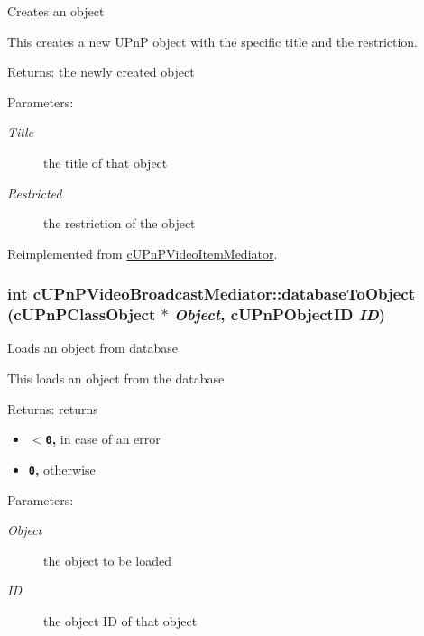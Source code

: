 Creates an object

This creates a new UPnP object with the specific title and the restriction.

\begin{Desc}
\item[Returns:]the newly created object \end{Desc}
\begin{Desc}
\item[Parameters:]
\begin{description}
\item[{\em Title}]the title of that object \item[{\em Restricted}]the restriction of the object \end{description}
\end{Desc}
  

Reimplemented from \hyperlink{classcUPnPVideoItemMediator_27e001142c3651c36dfd3b7c450414c0}{cUPnPVideoItemMediator}.\hypertarget{classcUPnPVideoBroadcastMediator_33237e5d850c107d37be37c1646b17d7}{
\subsubsection[{databaseToObject}]{\setlength{\rightskip}{0pt plus 5cm}int cUPnPVideoBroadcastMediator::databaseToObject ({\bf cUPnPClassObject} $\ast$ {\em Object}, \/  {\bf cUPnPObjectID} {\em ID})}}
\label{classcUPnPVideoBroadcastMediator_33237e5d850c107d37be37c1646b17d7}


Loads an object from database

This loads an object from the database

\begin{Desc}
\item[Returns:]returns\begin{itemize}
\item {\bf {\tt $<$0},} in case of an error\item {\bf {\tt 0},} otherwise \end{itemize}
\end{Desc}
\begin{Desc}
\item[Parameters:]
\begin{description}
\item[{\em Object}]the object to be loaded \item[{\em ID}]the object ID of that object \end{description}
\end{Desc}
 

